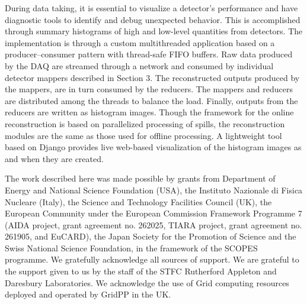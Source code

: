 \documentclass{JINST}
\begin{document}

During data taking, it is essential to visualize a detector's performance and have diagnostic tools to identify and debug unexpected behavior. This is accomplished through summary histograms of  high and low-level quantities from detectors. The implementation is through a custom multithreaded application based on a producer--consumer pattern with thread-safe FIFO buffers. Raw data produced by the DAQ are streamed through a network and consumed by individual detector mappers described in Section 3. The reconstructed outputs produced by the mappers,  are in turn consumed by the reducers. The mappers and reducers are distributed among the threads to balance the load. Finally,  outputs from the reducers are written as histogram images. Though the framework for the online reconstruction is based on parallelized processing of spills, the reconstruction modules are the same as those used for offline processing. A lightweight tool based on Django \cite{Django} provides live web-based visualization of the histogram images as and when they are created.





\acknowledgments

The work described here was made possible by grants from Department of Energy and National Science Foundation
(USA), the Instituto Nazionale di Fisica Nucleare (Italy), the Science and Technology Facilities Council
(UK), the European Community under the European Commission Framework Programme 7 (AIDA project,
grant agreement no. 262025, TIARA project, grant agreement no. 261905, and EuCARD), the Japan Society
for the Promotion of Science and the Swiss National Science Foundation, in the framework of the SCOPES
programme. We gratefully acknowledge all sources of support. We are grateful to the support given to us
by the staff of the STFC Rutherford Appleton and Daresbury Laboratories. We acknowledge the use of Grid
computing resources deployed and operated by GridPP \cite{GridPP} in the UK.
\end{document}
